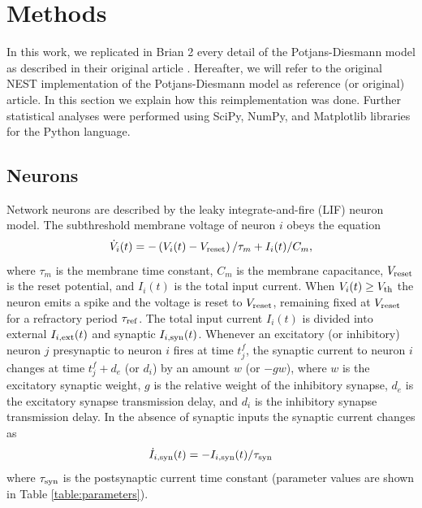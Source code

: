 \documentclass[10pt,a4paper,onecolumn]{article}
\begin{document}
\section{Methods}\label{methods}

In this work, we replicated in Brian 2 every detail of the Potjans-Diesmann model as described in their original article \cite{potjans2014}. Hereafter, we will refer to the original NEST implementation of the Potjans-Diesmann model \cite{potjans2014} as reference (or original) article.  In this section we explain how this reimplementation was done. Further statistical analyses were performed using SciPy, NumPy, and Matplotlib libraries for the Python language.
 
\subsection{Neurons}

Network neurons are described by the leaky integrate-and-fire (LIF) neuron model. The subthreshold membrane voltage of neuron $i$ obeys the equation
\begin{equation}
\label{Eq:LIF}
\dot{V}_i(t) = -\left( V_i(t) - V_{\rm reset} \right) /\tau_m + I_i(t)/C_m,
\end{equation}
where $\tau_m$ is the membrane time constant, $C_m$ is the membrane capacitance, $V_{\rm reset}$ is the reset potential, and $I_i(t)$ is the total input current. When $V_i(t) \geq V_{\rm th}$ the neuron emits a spike and the voltage is reset to $V_{\rm reset}$, remaining fixed at $V_{\rm reset}$ for a refractory period $\tau_{\rm ref}$. The total input current $I_i(t)$ is divided into external $I_{i, \rm ext}(t)$ and synaptic $I_{i, \rm syn}(t)$. Whenever an excitatory (or inhibitory) neuron $j$ presynaptic to neuron $i$ fires at time $t_{j}^{f}$, the synaptic current to neuron $i$ changes at time $t_{j}^{f}+d_e$ (or $d_i$) by an amount $w$ (or $-g w$), where $w$ is the excitatory synaptic weight, $g$ is the relative weight of the inhibitory synapse, $d_e$ is the excitatory synapse transmission delay, and $d_i$ is the inhibitory synapse transmission delay. In the absence of synaptic inputs the synaptic current changes as
\begin{equation}
\label{Eq:Isyn}
\dot{I}_{i, \rm syn}(t) = -I_{i, \rm syn}(t)/\tau_{\rm syn} 
\end{equation}
\noindent where $\tau_{\rm syn}$ is the postsynaptic current time constant (parameter values are shown in Table \ref{table:parameters}).
\end{document}
